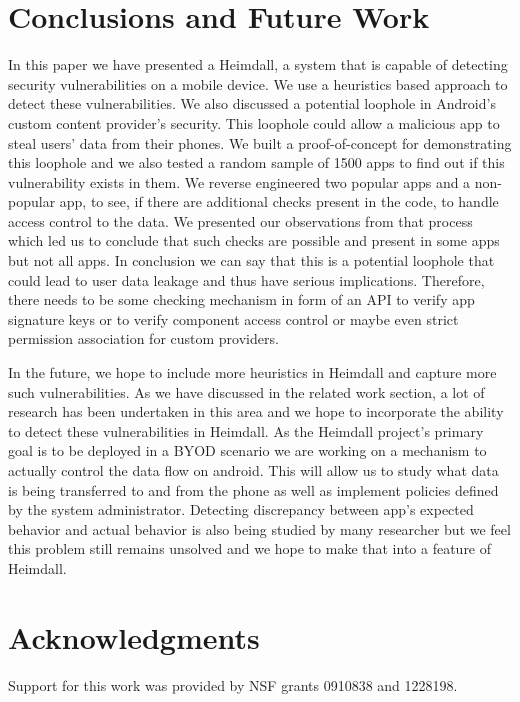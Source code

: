 \section{Conclusions and Future Work}
\label{concl}
In this paper we have presented a Heimdall, a system that is capable of detecting security vulnerabilities on a mobile device. We use a heuristics based approach to detect these vulnerabilities. We also discussed a potential loophole in Android's custom content provider's security. This loophole could allow a malicious app to steal users' data from their phones. We built a proof-of-concept for demonstrating this loophole and we also tested a random sample of 1500 apps to find out if this vulnerability exists in them. We reverse engineered two popular apps and a non-popular app, to see, if there are additional checks present in the code, to handle access control to the data. We presented our observations from that process which led us to conclude that such checks are possible and present in some apps but not all apps. In conclusion we can say that this is a potential loophole that could lead to user data leakage and thus have serious implications. Therefore, there needs to be some checking mechanism in form of an API to verify app signature keys or to verify component access control or maybe even strict permission association for custom providers.

In the future, we hope to include more heuristics in Heimdall and capture more such vulnerabilities. As we have discussed in the related work section, a lot of research has been undertaken in this area and we hope to incorporate the ability to detect these vulnerabilities in Heimdall. As the Heimdall project's primary goal is to be deployed in a BYOD scenario we are working on a mechanism to actually control the data flow on android. This will allow us to study what data is being transferred to and from the phone as well as implement policies defined by the system administrator. Detecting discrepancy between app's expected behavior and actual behavior is also being studied by many researcher but we feel this problem still remains unsolved and we hope to make that into a feature of Heimdall. 

\section{Acknowledgments}
Support for this work was provided by NSF grants 0910838 and 1228198.


%
%

